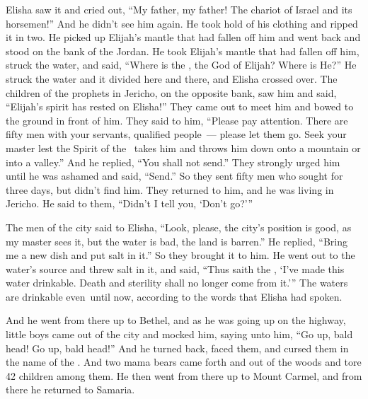 \begin{inparaenum}
   Elisha saw it and cried out, ``My father, my father! The chariot of Israel and its horsemen!'' And he didn't see him again. He took hold of his clothing and ripped it in two.%
   He picked up Elijah's mantle that had fallen off him and went back and stood on the bank of the Jordan.%
   He took Elijah's mantle that had fallen off him, struck the water, and said, ``Where is the \lord, the God of Elijah? Where is He?'' He struck the water and it divided here and there, and Elisha crossed over.%
   The children of the prophets in Jericho, on the opposite bank, saw him and said, ``Elijah's spirit has rested on Elisha!'' They came out to meet him and bowed to the ground in front of him.%
   They said to him, ``Please pay attention. There are fifty men with your servants, qualified people~--- please let them go. Seek your master lest the Spirit of the \lord\ takes him and throws him down onto a mountain or into a valley.'' And he replied, ``You shall not send.''%
   They strongly urged him until he was ashamed and said, ``Send.'' So they sent fifty men who sought for three days, but didn't find him.%
   They returned to him, and he was living in Jericho. He said to them, ``Didn't I tell you, `Don't go?'\thinspace''%

   The men of the city said to Elisha, ``Look, please, the city's position is good, as my master sees it, but the water is bad, the land is barren.''%
   He replied, ``Bring me a new dish and put salt in it.'' So they brought it to him.%
   He went out to the water's source and threw salt in it, and said, ``Thus saith the \lord, `I've made this water drinkable. Death and sterility shall no longer come from it.'\thinspace''%
   The waters are drinkable even\understood{}\ until now, according to the words that Elisha had spoken.%

   And he went from there up to Bethel, and as he was going up on the highway, little boys came out of the city and mocked him, saying unto him, ``Go up, bald head! Go up, bald head!''%
   And he turned back, faced them, and cursed them in the name of the \lord. And two mama bears came forth and out of the woods and tore 42 children among them.%
   He then went from there up to Mount Carmel, and from there he returned to Samaria.%
\end{inparaenum}
